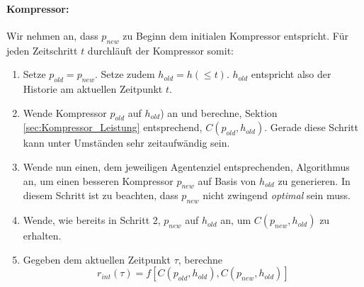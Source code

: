 \paragraph{Kompressor:} Wir nehmen an, dass \(p_{new}\) zu Beginn dem initialen Kompressor entspricht. Für jeden Zeitschritt \(t\) durchläuft der Kompressor somit:
\begin{enumerate}
  \item Setze \(p_{old} = p_{new}\). Setze zudem \(h_{old} = h(\leq t)\). \(h_{old}\) entspricht also der Historie am aktuellen Zeitpunkt \(t\).
  \item Wende Kompressor \(p_{old}\) auf \(h_{old}\)) an und berechne, Sektion \ref{sec:Kompressor_Leistung} entsprechend, \(C(p_{old},h_{old})\). Gerade diese Schritt kann unter Umständen sehr zeitaufwändig sein.
  \item Wende nun einen, dem jeweiligen Agentenziel entsprechenden, Algorithmus an, um einen besseren Kompressor \(p_{new}\) auf Basis von \(h_{old}\) zu generieren. In diesem Schritt ist zu beachten, dass \(p_{new}\) nicht zwingend \emph{optimal} sein muss.
  \item Wende, wie bereits in Schritt 2, \(p_{new}\) auf \(h_{old}\) an, um \(C(p_{new},h_{old})\) zu erhalten.
  \item Gegeben dem aktuellen Zeitpunkt \(\tau\), berechne \begin{equation} r_{int}(\tau) = f \left[C(p_{old},h_{old}),C(p_{new},h_{old})\right] \end{equation}
\end{enumerate} \cite[p.~20]{curiosity_schmidhuber}

